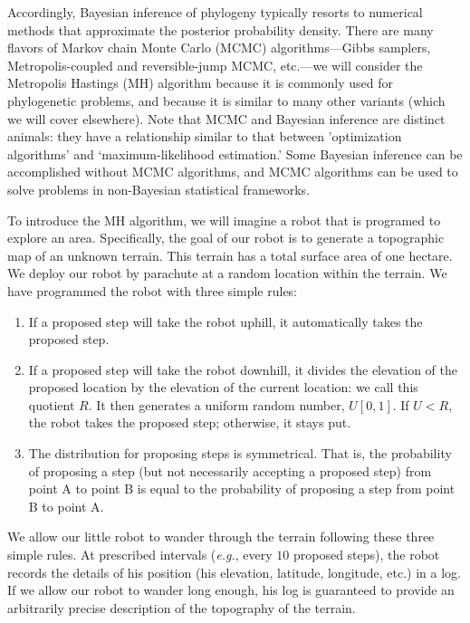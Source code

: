 \documentclass[11pt]{article}
\begin{document}
Accordingly, Bayesian inference of phylogeny typically resorts to numerical methods that approximate the posterior probability density. 
There are many flavors of Markov chain Monte Carlo (MCMC) algorithms---Gibbs samplers, Metropolis-coupled and reversible-jump MCMC, etc.---we will consider the Metropolis Hastings (MH) algorithm because it is commonly used for phylogenetic problems, and because it is similar to many other variants (which we will cover elsewhere). 
Note that MCMC and Bayesian inference are distinct animals: they have a relationship similar to that between ’optimization algorithms’ and ‘maximum-likelihood estimation.’ 
Some Bayesian inference can be accomplished without MCMC algorithms, and MCMC algorithms can be used to solve problems in non-Bayesian statistical frameworks.

To introduce the MH algorithm, we will imagine a robot that is programed to explore an area. 
Specifically, the goal of our robot is to generate a topographic map of an unknown terrain. 
This terrain has a total surface area of one hectare. 
We deploy our robot by parachute at a random location within the terrain. 
We have programmed the robot with three simple rules:

\begin{enumerate}
\item{If a proposed step will take the robot uphill, it automatically takes the proposed step.}

\item{If a proposed step will take the robot downhill, it divides the elevation of the proposed location by the elevation of the current location: we call this quotient $R$. 
It then generates a uniform random number, $U[0,1]$. 
If $U<R$, the robot takes the proposed step; otherwise, it stays put.}

\item{The distribution for proposing steps is symmetrical. 
That is, the probability of proposing a step (but not necessarily accepting a proposed step) from point A to point B is equal to the probability of proposing a step from point B to point A.}
\end{enumerate}

We allow our little robot to wander through the terrain following these three simple rules. 
At prescribed intervals  ({\it e.g.}, every $10$ proposed steps), the robot records the details of his position (his elevation, latitude, longitude, etc.) in a log. 
If we allow our robot to wander long enough, his log is guaranteed to provide an arbitrarily precise description of the topography of the terrain. 
\end{document}
